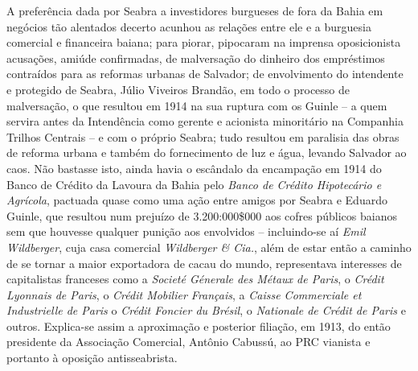A preferência dada por Seabra a investidores burgueses de fora da Bahia em negócios tão alentados decerto acunhou as relações entre ele e a burguesia comercial e financeira baiana; para piorar, pipocaram na imprensa oposicionista acusações, amiúde confirmadas, de malversação do dinheiro dos empréstimos contraídos para as reformas urbanas de Salvador; de envolvimento do intendente e protegido de Seabra, Júlio Viveiros Brandão, em todo o processo de malversação, o que resultou em 1914 na sua ruptura com os Guinle -- a quem servira antes da Intendência como gerente e acionista minoritário na Companhia Trilhos Centrais -- e com o próprio Seabra; tudo resultou em paralisia das obras de reforma urbana e também do fornecimento de luz e água, levando Salvador ao caos. Não bastasse isto, ainda havia o escândalo da encampação em 1914 do Banco de Crédito da Lavoura da Bahia pelo \textit{Banco de Crédito Hipotecário e Agrícola}, pactuada quase como uma ação entre amigos por Seabra e Eduardo Guinle, que resultou num prejuízo de 3.200:000\$000 aos cofres públicos baianos sem que houvesse qualquer punição aos envolvidos -- incluindo-se aí \textit{Emil Wildberger}, cuja casa comercial \textit{Wildberger \& Cia.}, além de estar então a caminho de se tornar a maior exportadora de cacau do mundo, representava interesses de capitalistas franceses como a \textit{Societé Génerale des Métaux de Paris}, o \textit{Crédit Lyonnais de Paris}, o \textit{Crédit Mobilier Français}, a \textit{Caisse Commerciale et Industrielle de Paris} o \textit{Crédit Foncier du Brésil}, o \textit{Nationale de Crédit de Paris} e outros. Explica-se assim a aproximação e posterior filiação, em 1913, do então presidente da Associação Comercial, Antônio Cabussú, ao PRC vianista e portanto à oposição antisseabrista.

